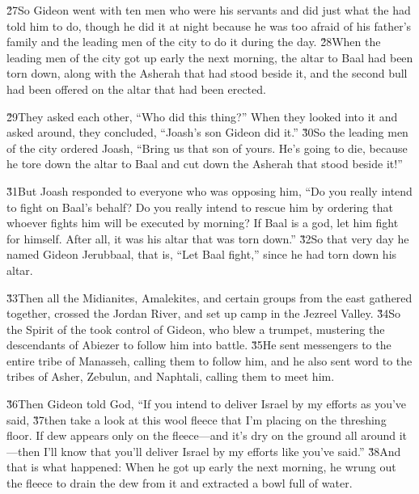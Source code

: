 \v{27}So Gideon went with ten men who were his servants and did just what the  had told him to do, though he did it at night because he was too afraid of his father's family and the leading men of the city to do it during the day. \v{28}When the leading men of the city got up early the next morning, the altar to Baal had been torn down, along with the Asherah that had stood beside it, and the second bull had been offered on the altar that had been erected.

\v{29}They asked each other, ``Who did this thing?'' When they looked into it and asked around, they concluded, ``Joash's son Gideon did it.'' \v{30}So the leading men of the city ordered Joash, ``Bring us that son of yours. He's going to die, because he tore down the altar to Baal and cut down the Asherah that stood beside it!''

\v{31}But Joash responded to everyone who was opposing him, ``Do you really intend to fight on Baal's behalf? Do you really intend to rescue him by ordering that whoever fights him will be executed by morning? If Baal is a god, let him fight for himself. After all, it was his altar that was torn down.'' \v{32}So that very day he named Gideon Jerubbaal, that is, ``Let Baal fight,'' since he had torn down his altar.

\v{33}Then all the Midianites, Amalekites, and certain groups from the east gathered together, crossed the Jordan River, and set up camp in the Jezreel Valley. \v{34}So the Spirit of the  took control of Gideon, who blew a trumpet, mustering the descendants of Abiezer to follow him into battle. \v{35}He sent messengers to the entire tribe of Manasseh, calling them to follow him, and he also sent word to the tribes of Asher, Zebulun, and Naphtali, calling them to meet him.

\v{36}Then Gideon told God, ``If you intend to deliver Israel by my efforts as you've said, \v{37}then take a look at this wool fleece that I'm placing on the threshing floor. If dew appears only on the fleece---and it's dry on the ground all around it---then I'll know that you'll deliver Israel by my efforts like you've said.'' \v{38}And that is what happened: When he got up early the next morning, he wrung out the fleece to drain the dew from it and extracted a bowl full of water.

